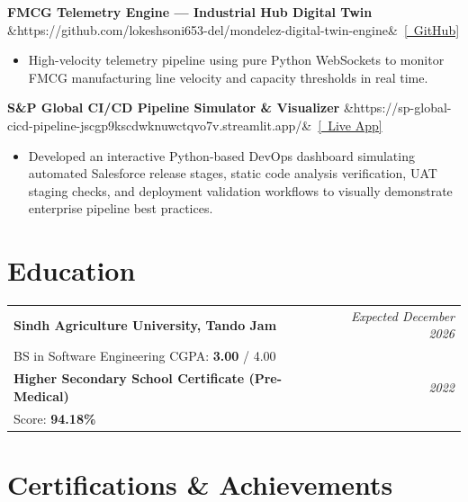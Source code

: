 \documentclass[10pt, a4paper]{article}
\newcommand{\proj}[3]{%
  \textbf{#1}%
  \ifx&#3&\else~\href{#3}{\small\textcolor{accent}{[\faExternalLinkAlt~#2]}}\fi
}
\begin{document}
\vspace{2pt}

\proj{FMCG Telemetry Engine — Industrial Hub Digital Twin}{GitHub}{https://github.com/lokeshsoni653-del/mondelez-digital-twin-engine}
\begin{itemize}
  \item High-velocity telemetry pipeline using pure Python WebSockets to monitor FMCG manufacturing line velocity and capacity thresholds in real time.
\end{itemize}

\vspace{2pt}

\proj{S\&P Global CI/CD Pipeline Simulator \& Visualizer}{Live App}{https://sp-global-cicd-pipeline-jscgp9kscdwknuwctqvo7v.streamlit.app/}
\begin{itemize}
  \item Developed an interactive Python-based DevOps dashboard simulating automated Salesforce release stages, static code analysis verification, UAT staging checks, and deployment validation workflows to visually demonstrate enterprise pipeline best practices.
\end{itemize}

\section{Education}

\begin{tabularx}{\textwidth}{@{}Xr@{}}
  \textbf{Sindh Agriculture University, Tando Jam} & \textit{Expected December 2026}\\
  BS in Software Engineering \hspace{1em}\textcolor{muted}{\small CGPA: \textbf{3.00} / 4.00} &\\[3pt]
  \textbf{Higher Secondary School Certificate (Pre-Medical)} & \textit{2022}\\
  \textcolor{muted}{\small Score: \textbf{94.18\%}} &\\
\end{tabularx}

\section{Certifications \& Achievements}
\end{document}

